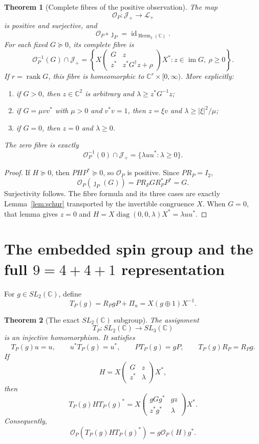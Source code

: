 \documentclass[11pt]{article}
\newtheorem{theorem}{Theorem}[section]
\theoremstyle{definition}
\newcommand{\C}{\mathbb C}
\newcommand{\Herm}{\operatorname{Herm}}
\newcommand{\rank}{\operatorname{rank}}
\newcommand{\im}{\operatorname{im}}
\newcommand{\id}{\operatorname{id}}
\newcommand{\diag}{\operatorname{diag}}
\newcommand{\Jp}{\mathcal J_+}
\newcommand{\Lp}{\mathcal L_+}
\begin{document}
\begin{theorem}[Complete fibres of the positive observation]\label{thm:fibres}
The map
\[
 \mathcal O_P:\Jp\longrightarrow\Lp
\]
is positive and surjective, and
\[
 \boxed{\mathcal O_P\circ\jmath_P=\id_{\Herm_2(\C)}.}
\]
For each fixed $G\succeq0$, its complete fibre is
\[
 \boxed{
 \mathcal O_P^{-1}(G)\cap\Jp
 =\left\{
 X\begin{pmatrix}
 G&z\\z^*&z^*G^\dagger z+\rho
 \end{pmatrix}X^*:
 z\in\im G,\ \rho\geq0
 \right\}.}
\]
If $r=\rank G$, this fibre is homeomorphic to $\C^r\times[0,\infty)$.  More explicitly:
\begin{enumerate}[label=\textup{(\roman*)}]
\item if $G>0$, then $z\in\C^2$ is arbitrary and $\lambda\geq z^*G^{-1}z$;
\item if $G=\mu vv^*$ with $\mu>0$ and $v^*v=1$, then $z=\xi v$ and $\lambda\geq|\xi|^2/\mu$;
\item if $G=0$, then $z=0$ and $\lambda\geq0$.
\end{enumerate}
The zero fibre is exactly
\[
 \boxed{
 \mathcal O_P^{-1}(0)\cap\Jp
 =\{\lambda uu^*: \lambda\geq0\}.}
\]
\end{theorem}

\begin{proof}
If $H\succeq0$, then $PHP^*\succeq0$, so $\mathcal O_P$ is positive.  Since $PR_P=I_2$,
\[
 \mathcal O_P(\jmath_P(G))
 =PR_PGR_P^*P^*=G.
\]
Surjectivity follows.  The fibre formula and its three cases are exactly Lemma~\ref{lem:schur} transported by the invertible congruence $X$.  When $G=0$, that lemma gives $z=0$ and $H=X\diag(0,0,\lambda)X^*=\lambda uu^*$.
\end{proof}

\section[The embedded spin group and the full 9=4+4+1 representation]{The embedded spin group and the full \texorpdfstring{$9=4+4+1$}{9=4+4+1} representation}

For $g\in SL_2(\C)$, define
\[
 \boxed{
 T_P(g)=R_PgP+\Pi_u
 =X(g\oplus1)X^{-1}.}
\]

\begin{theorem}[The exact $SL_2(\C)$ subgroup]\label{thm:spin-embedding}
The assignment
\[
 T_P:SL_2(\C)\longrightarrow SL_3(\C)
\]
is an injective homomorphism.  It satisfies
\[
 T_P(g)u=u,\qquad u^*T_P(g)=u^*,\qquad
 PT_P(g)=gP,\qquad T_P(g)R_P=R_Pg.
\]
If
\[
 H=X\begin{pmatrix}G&z\\z^*&\lambda\end{pmatrix}X^*,
\]
then
\[
 T_P(g)HT_P(g)^*
 =X\begin{pmatrix}
 gGg^*&gz\\z^*g^*&\lambda
 \end{pmatrix}X^*.
\]
Consequently,
\[
 \boxed{
 \mathcal O_P(T_P(g)HT_P(g)^*)
 =g\mathcal O_P(H)g^*.}
\]
\end{theorem}
\end{document}
